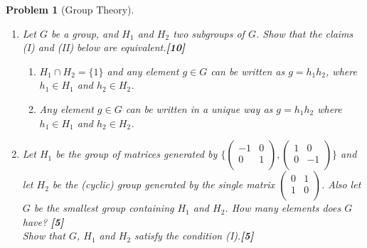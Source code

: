 \documentclass[a4paper]{article}
\theoremstyle{new}
\newtheorem{qns}{Problem}[section]
\begin{document}
\begin{qns}[Group Theory]\leavevmode
\begin{enumerate}[label=(\alph*)]
\item Let $G$ be a group, and $H_1$ and $H_2$ two subgroups of $G$. Show that the claims (I) and (II) below are equivalent.\hfill\textbf{[10]}
\begin{enumerate}[label=\Roman*.]
    \item $H_1\cap H_2 = \{1\}$ and any element $g\in G$ can be written as $g = h_1h_2$, where $h_1\in H_1$ and $h_2\in H_2$.
    \item Any element $g\in G$ can be written in a unique way as $g = h_1h_2$ where $h_1\in H_1$ and $h_2\in H_2$.
\end{enumerate}
\item Let $H_1$ be the group of matrices generated by $\bigg\{\begin{pmatrix}-1&0\\0&1\\\end{pmatrix},\begin{pmatrix}1&0\\0&-1\\\end{pmatrix}\bigg\}$ and let $H_2$ be the (cyclic) group generated by the single matrix $\begin{pmatrix}0&1\\1&0\\\end{pmatrix}$. Also let $G$ be the smallest group containing $H_1$ and $H_2$. How many elements does $G$ have? \hfill\textbf{[5]}\\[5pt]
Show that $G$, $H_1$ and $H_2$ satisfy the condition (I).\hfill\textbf{[5]}
\end{enumerate}
\end{qns}
\end{document}
